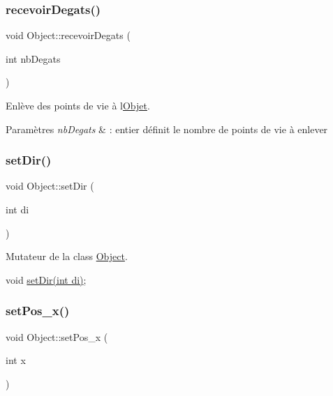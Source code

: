 \subsubsection{\texorpdfstring{recevoir\+Degats()}{recevoirDegats()}}
{\footnotesize\ttfamily void Object\+::recevoir\+Degats (\begin{DoxyParamCaption}\item[{int}]{nb\+Degats }\end{DoxyParamCaption})}



Enlève des points de vie à l\textquotesingle{}\hyperlink{class_objet}{Objet}. 


\begin{DoxyParams}{Paramètres}
{\em nb\+Degats} & \+: entier définit le nombre de points de vie à enlever \\
\hline
\end{DoxyParams}
\mbox{\label{class_object_a6d72ba9034f1ea3a0866574705e938d3}} 
\subsubsection{\texorpdfstring{set\+Dir()}{setDir()}}
{\footnotesize\ttfamily void Object\+::set\+Dir (\begin{DoxyParamCaption}\item[{int}]{di }\end{DoxyParamCaption})}



Mutateur de la class \hyperlink{class_object}{Object}. 

void \hyperlink{class_object_a6d72ba9034f1ea3a0866574705e938d3}{set\+Dir(int di)}; \mbox{\label{class_object_a65c8e1794d02320269340d22084d0807}} 
\subsubsection{\texorpdfstring{set\+Pos\+\_\+x()}{setPos\_x()}}
{\footnotesize\ttfamily void Object\+::set\+Pos\+\_\+x (\begin{DoxyParamCaption}\item[{int}]{x }\end{DoxyParamCaption})}



